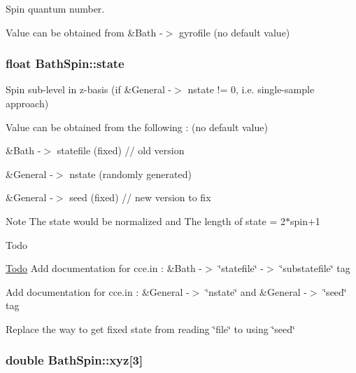 Spin quantum number. 

Value can be obtained from \&Bath -\/$>$ gyrofile (no default value) \hypertarget{structBathSpin_a6348f965fe820b03094f4c620ab7ffe0}{
\subsubsection[{state}]{\setlength{\rightskip}{0pt plus 5cm}float Bath\-Spin\-::state}}\label{structBathSpin_a6348f965fe820b03094f4c620ab7ffe0}


Spin sub-\/level in z-\/basis (if \&General -\/$>$ nstate != 0, i.\-e. single-\/sample approach) 

Value can be obtained from the following \-: (no default value)
\begin{DoxyItemize}
\item \&Bath -\/$>$ statefile (fixed) // old version
\item \&General -\/$>$ nstate (randomly generated)
\item \&General -\/$>$ seed (fixed) // new version to fix \begin{DoxyNote}{Note}
The state would be normalized and The length of state = 2$\ast$spin+1 
\end{DoxyNote}
\begin{DoxyRefDesc}{Todo}
\item[\hyperlink{todo__todo000005}{Todo}]Add documentation for cce.\-in \-: \&Bath -\/$>$ \char`\"{}statefile\char`\"{} -\/$>$ \char`\"{}substatefile\char`\"{} tag 

Add documentation for cce.\-in \-: \&General -\/$>$ \char`\"{}nstate\char`\"{} and \&General -\/$>$ \char`\"{}seed\char`\"{} tag 

Replace the way to get fixed state from reading \char`\"{}file\char`\"{} to using \char`\"{}seed\char`\"{} \end{DoxyRefDesc}

\end{DoxyItemize}\hypertarget{structBathSpin_ae88f65d01b379916181269efa6c33e8a}{
\subsubsection[{xyz}]{\setlength{\rightskip}{0pt plus 5cm}double Bath\-Spin\-::xyz\mbox{[}3\mbox{]}}}\label{structBathSpin_ae88f65d01b379916181269efa6c33e8a}


